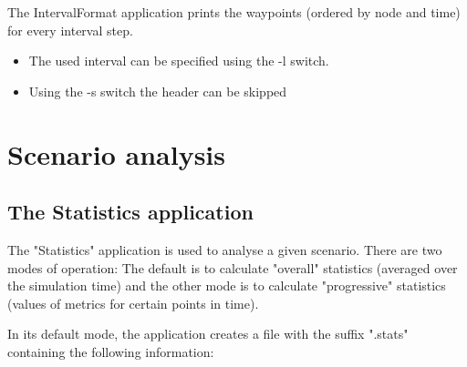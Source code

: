 \documentclass[11pt,a4paper,twoside,normalheadings,headsepline,DIV13,BCOR11mm,openright]{article}
\begin{document}
The IntervalFormat application prints the waypoints (ordered by node
and time) for every interval step.
\begin{itemize}
\item The used interval can be specified using the -l switch.
\item Using the -s switch the header can be skipped
\end{itemize}


\section{Scenario analysis}

\subsection{The Statistics application}


The "Statistics" application is used to analyse a given scenario.  There
are  two  modes  of  operation:  The  default  is to calculate "overall"
statistics (averaged over the simulation time) and the other mode is  to
calculate "progressive" statistics (values of metrics for certain points
in time).

In its default mode, the application creates  a  file  with  the  suffix
".stats" containing the following information:
\end{document}
